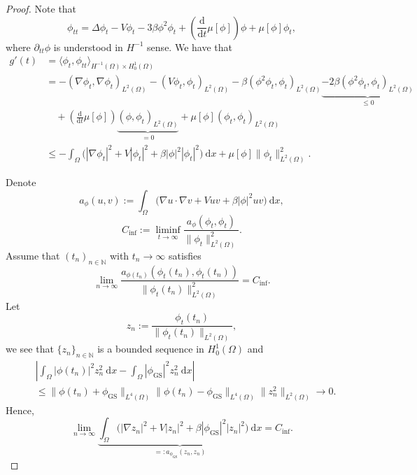 \documentclass[10pt,a4paper]{amsart}
\def\nn{\nonumber}
\begin{document}
\begin{proof}
	Note that 
\begin{equation*}
	\phi_{tt} = \Delta \phi_t - V \phi_t - 3 \beta \phi^2 \phi_t + \left( \frac{\text{d}}{\text{d}t} \mu[\phi] \right) \phi + \mu[\phi]\phi_t,
\end{equation*}
where $\partial_{tt}\phi$ is understood in $H^{-1}$ sense. We have that 
\begin{align}
	g'(t) & = \langle\phi_t, \phi_{tt}\rangle_{H^{-1}(\Omega) \times H_0^1(\Omega)} \nn \\
	& = -(\nabla \phi_t,  \nabla \phi_t)_{L^2(\Omega)} - (V\phi_t,\phi_t)_{L^2(\Omega)}  - \beta (\phi^2 \phi_t, \phi_t)_{L^2(\Omega)} \underbrace{- 2\beta (\phi^2 \phi_t, \phi_t)_{L^2(\Omega)}}_{\le 0} \nn \\
	& \quad + \left( \frac{\text{d}}{\text{d}t} \mu[\phi] \right) \underbrace{(\phi, \phi_t)_{L^2(\Omega)}}_{ = 0} + \mu[\phi] (\phi_t,\phi_t)_{L^2(\Omega)} \nn \\
	& \le - \int_{\Omega} \Big( |\nabla \phi_t|^2 + V|\phi_t|^2 + \beta|\phi|^2 |\phi_t|^2 \Big) \ \text{d}x + \mu[\phi]\|\phi_t\|_{L^2(\Omega)}^2.
\end{align}

Denote 
\begin{equation*}
a_{\phi}(u,v):= \int_{\Omega} \Big( \nabla u \cdot \nabla v + V uv + \beta|\phi|^2 uv \Big) \ \text{d}x,
\end{equation*}
\begin{equation*}
	C_{\text{inf}}:= \liminf_{t \to \infty} \frac{a_{\phi}(\phi_t,\phi_t)}{\|\phi_t\|_{L^2(\Omega)}^2}.
\end{equation*}
Assume that $(t_n)_{n \in \mathbb{N}}$ with $t_n \to \infty$ satisfies
\begin{equation*}
	\lim_{n \to \infty} \frac{a_{\phi(t_n)}(\phi_t(t_n),\phi_t(t_n))}{\|\phi_t(t_n)\|_{L^2(\Omega)}^2} = C_{\text{inf}}.
\end{equation*}
Let
\begin{equation*}
	z_n:= \frac{\phi_t(t_n)}{\|\phi_t(t_n)\|_{L^2(\Omega)}},
\end{equation*}
we see that $\{z_n\}_{n \in \mathbb{N}}$ is a bounded sequence in $H_0^1(\Omega)$ and
\begin{align*}
	&\left| \int_{\Omega} |\phi(t_n)|^2 z_n^2 \ \text{d}x - \int_{\Omega} |\phi_{\text{GS}}|^2 z_n^2 \ \text{d}x    \right| \\
	 & \le \| \phi(t_n) + \phi_{\text{GS}}\|_{L^4(\Omega)}\| \phi(t_n) - \phi_{\text{GS}}\|_{L^4(\Omega)}\|z_n^2\|_{L^2(\Omega)}  \to 0.
\end{align*}
Hence, 
\begin{equation*}
	\lim_{n \to \infty} \underbrace{ \int_{\Omega} \Big( |\nabla  z_n|^2 + V| z_n|^2 + \beta|\phi_{\text{GS}}|^2 |z_n|^2 \Big) \ \text{d}x}_{=: a_{\phi_{\text{GS}}}(z_n,z_n)} = C_{\text{inf}}.
\end{equation*}


\end{proof}
\end{document}
